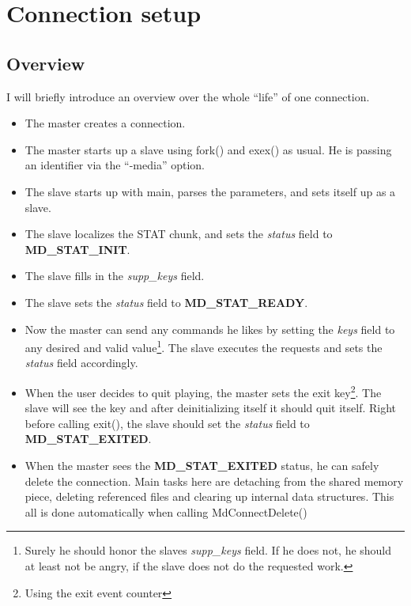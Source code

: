 

\section{Connection setup}

\subsection*{Overview}
I will briefly introduce an overview over the whole ``life'' of one
connection.

\begin{itemize}
   \item The master creates a connection.
   \item The master starts up a slave using fork() and exex() as usual.
         He is passing an identifier via the ``-media'' option.
   \item The slave starts up with main, parses the parameters, and sets
   	 itself up as a slave.
   \item The slave localizes the STAT chunk, and sets the {\it status}
         field to {\bf MD\_STAT\_INIT}.
   \item The slave fills in the {\it supp\_keys} field.
   \item The slave sets the {\it status} field to {\bf MD\_STAT\_READY}.
   \item Now the master can send any commands he likes by setting the
         {\it keys} field to any desired and valid value\footnote{Surely
         he should honor the slaves
         {\it supp\_keys} field. If he does not, he should at least not
         be angry, if the slave does not do the requested work.}. The slave
         executes the requests and sets the {\it status} field accordingly.
   \item When the user decides to quit playing, the master sets the
   	 exit key\footnote{Using the exit event counter}. The slave will see
	 the key and after deinitializing itself it should quit itself.
   	 Right before calling exit(), the slave should set the
   	 {\it status} field to {\bf MD\_STAT\_EXITED}.
   \item When the master sees the {\bf MD\_STAT\_EXITED} status, he can
         safely delete the connection.
	 Main tasks here are detaching from the shared memory piece, deleting
	 referenced files and clearing up internal data structures. This all is
	 done automatically when calling MdConnectDelete()
\end{itemize}
   
